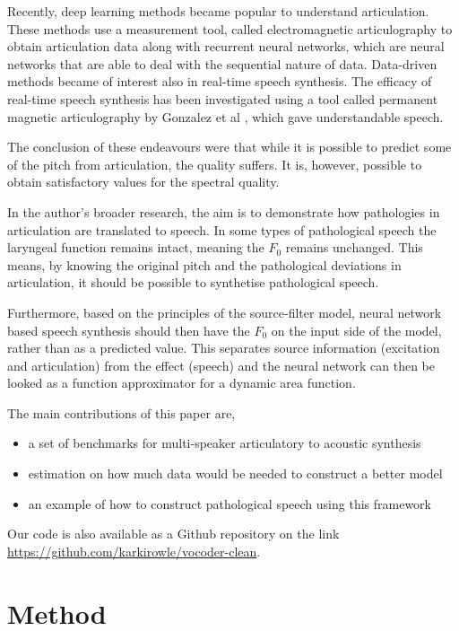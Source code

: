 \documentclass[a4paper]{article}
\begin{document}
Recently, deep learning methods became popular
to understand articulation. These methods use a measurement tool,
called electromagnetic articulography to obtain articulation data 
\cite{Aryal2016} \cite{Taguchi} \cite{Liu2018} along with recurrent
neural networks, which are neural networks that are able to deal with
the sequential nature of data. Data-driven methods became of interest also
in real-time speech synthesis. The efficacy of real-time speech synthesis
has been investigated using a tool called permanent magnetic articulography
by Gonzalez et al \cite{Gonzalez2017}, which gave understandable
speech.

The conclusion of these endeavours were that while it is possible to
predict some of the pitch from articulation, the quality suffers.
It is, however, possible to obtain satisfactory values for the
spectral quality.

In the author's broader research, the aim is to demonstrate how pathologies in
articulation are translated to speech. In some types of pathological
speech the laryngeal function remains intact, meaning the \( F_0 \)
remains unchanged. This means, by knowing the original pitch and the
pathological deviations in articulation, it should be possible to
synthetise pathological speech.

Furthermore, based on the principles of the source-filter model, neural
network based speech synthesis should then have the \( F_0 \) on the
input side of the model, rather than as a predicted value. This separates
source information (excitation and articulation) from the effect (speech)
and the neural network can then be looked as a function approximator
for a dynamic area function.

The main contributions of this paper are,
\begin{itemize}
\item a set of benchmarks for multi-speaker articulatory to acoustic synthesis
\item estimation on how much data would be needed to construct a better model
\item an example of how to construct pathological speech using this framework
\end{itemize}

Our code is also available as a Github repository on the link
\url{https://github.com/karkirowle/vocoder-clean}.

\section{Method}
\end{document}
